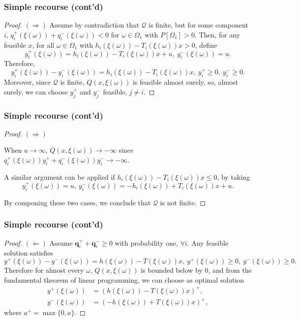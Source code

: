 \documentclass{beamer}
\begin{document}
\begin{frame}
\frametitle{Simple recourse (cont'd)}

\begin{proof}
{\bf $(\Rightarrow)$} 
Assume by contradiction that $\mathcal{Q}$ is finite, but for some component $i$, $q_i^+(\xi(\omega)) + q_i^-(\xi(\omega)) < 0$ for $\omega \in \Omega_1$ with $P[\Omega_1] > 0$.
Then, for any feasible $x$, for all $\omega \in \Omega_1$ with $h_i(\xi(\omega))-T_i(\xi(\omega))x > 0$, define
$$
y_i^+(\xi(\omega)) = h_i(\xi(\omega)) - T_i(\xi(\omega))x + u,\  y_i^-(\xi(\omega)) = u.
$$
Therefore, 
$$
y_i^+(\xi(\omega)) - y_i^-(\xi(\omega)) = h_i(\xi(\omega)) - T_i(\xi(\omega))x,\ y_i^+ \geq 0,\ y_i^- \geq 0.
$$
Moreover, since $\mathcal{Q}$ is finite, $Q(x, \xi(\omega))$ is feasible almost surely,
so, almost surely, we can choose $y_j^+$ and $y_j^-$ feasible, $j \ne i$.

\end{proof}

\end{frame}

\begin{frame}
\frametitle{Simple recourse (cont'd)}

\begin{proof}
{\bf $(\Rightarrow)$} 

When $u \rightarrow \infty$, $Q(x, \xi(\omega)) \rightarrow -\infty$ since $q_i^+(\xi(\omega))y_i^+ + q_i^-(\xi(\omega))y_i^- \rightarrow -\infty$.

\mbox{}

A similar argument can be applied if $h_i(\xi(\omega))-T_i(\xi(\omega))x \leq 0$, by taking
$$
y_i^+(\xi(\omega)) = u,\ y_i^-(\xi(\omega)) = -h_i(\xi(\omega)) + T_i(\xi(\omega))x + u.
$$

\mbox{}

By componing these two cases, we conclude that  $\mathcal{Q}$ is not finite.
\end{proof}

\end{frame}

\begin{frame}
\frametitle{Simple recourse (cont'd)}
	
\begin{proof}

{\bf $(\Leftarrow)$}
Assume $\boldsymbol{q}_i^+ + \boldsymbol{q}_i^- \geq 0$ with probability one, $\forall i$.
Any feasible solution satisfies
$$
y^+(\xi(\omega))-y^-(\xi(\omega))=h(\xi(\omega))-T(\xi(\omega))x, \ y^+(\xi(\omega)) \geq 0,\ y^-(\xi(\omega)) \geq 0.
$$
Therefore for almost every $\omega$, $Q(x,\xi(\omega))$ is bounded below by 0, and
from the fundamental theorem of linear programming, we can choose as optimal solution
\begin{align*}
y^+(\xi(\omega)) &= \left(h(\xi(\omega))-T(\xi(\omega))x\right)^+,\\
y^-(\xi(\omega)) &= \left(-h(\xi(\omega))+T(\xi(\omega))x\right)^+,
\end{align*}
where $a^+ = \max\{0, a\}$.
\end{proof}

\end{frame}
\end{document}

